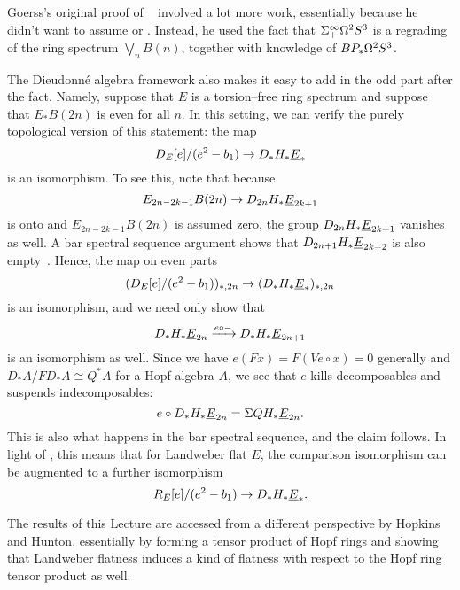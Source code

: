 \begin{remark}
Goerss's original proof of ~\cite{GoerssDieudonne} involved a lot more work, essentially because he didn't want to assume  or .  Instead, he used the fact that \(\Sigma^\infty_+ \Omega^2 S^3\) is a regrading of the ring spectrum \(\bigvee_n B(n)\), together with knowledge of \(BP_* \Omega^2 S^3\).
\end{remark}

\begin{remark}
The Dieudonn\'e algebra framework also makes it easy to add in the odd part after the fact.  Namely, suppose that \(E\) is a torsion--free ring spectrum and suppose that \(E_* B(2n)\) is even for all \(n\).  In this setting, we can verify the purely topological version of this statement: the map \[D_E[e] / (e^2 - b_1) \to D_* H_* \underline{\smash{E}}_{*}\] is an isomorphism.  To see this, note that because \[E_{2n-2k-1} B(2n) \to D_{2n} H_* \underline{\smash{E}}_{2k+1}\] is onto and \(E_{2n-2k-1} B(2n)\) is assumed zero, the group \(D_{2n} H_* \underline{\smash{E}}_{2k+1}\) vanishes as well.  A bar spectral sequence argument shows that \(D_{2n+1} H_* \underline{\smash{E}}_{2k+2}\) is also empty~\cite[Lemma 11.5.1]{GoerssDieudonne}.  Hence, the map on even parts \[(D_E[e] / (e^2 - b_1))_{*, 2n} \to (D_* H_* \underline{\smash{E}}_{*})_{*, 2n}\] is an isomorphism, and we need only show that \[D_* H_* \underline{\smash{E}}_{2n} \xrightarrow{e \circ -} D_* H_* \underline{\smash{E}}_{2n+1}\] is an isomorphism as well.  Since we have \(e(Fx) = F(Ve \circ x) = 0\) generally and \(D_* A / FD_* A \cong Q^* A\) for a Hopf algebra \(A\), we see that \(e\) kills decomposables and suspends indecomposables: \[e \circ D_* H_* \underline{\smash{E}}_{2n} = \Sigma QH_* \underline{\smash{E}}_{2n}.\]  This is also what happens in the bar spectral sequence, and the claim follows.  In light of , this means that for Landweber flat \(E\), the comparison isomorphism can be augmented to a further isomorphism \[R_E[e] / (e^2 - b_1) \to D_* H_* \underline{\smash{E}}_{*}.\]
\end{remark}

\begin{remark}
The results of this Lecture are accessed from a different perspective by Hopkins and Hunton, essentially by forming a tensor product of Hopf rings and showing that Landweber flatness induces a kind of flatness with respect to the Hopf ring tensor product as well.
\end{remark}










